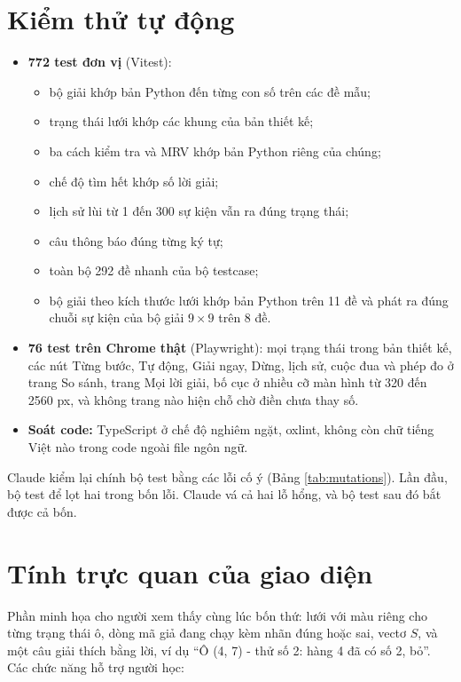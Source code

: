 \section{Kiểm thử tự động}

\begin{itemize}
  \item \textbf{772 test đơn vị} (Vitest):
  \begin{itemize}
    \item bộ giải khớp bản Python đến từng con số trên các đề mẫu;
    \item trạng thái lưới khớp các khung của bản thiết kế;
    \item ba cách kiểm tra và MRV khớp bản Python riêng của chúng;
    \item chế độ tìm hết khớp số lời giải;
    \item lịch sử lùi từ 1 đến 300 sự kiện vẫn ra đúng trạng thái;
    \item câu thông báo đúng từng ký tự;
    \item toàn bộ 292 đề nhanh của bộ testcase;
    \item bộ giải theo kích thước lưới khớp bản Python trên 11 đề và phát ra đúng chuỗi sự kiện của bộ giải \(9 \times 9\) trên 8 đề.
  \end{itemize}
  \item \textbf{76 test trên Chrome thật} (Playwright): mọi trạng thái trong bản thiết kế, các nút Từng bước, Tự động, Giải ngay, Dừng, lịch sử, cuộc đua và phép đo ở trang So sánh, trang Mọi lời giải, bố cục ở nhiều cỡ màn hình từ 320 đến 2560 px, và không trang nào hiện chỗ chờ điền chưa thay số.
  \item \textbf{Soát code:} TypeScript ở chế độ nghiêm ngặt, oxlint, không còn chữ tiếng Việt nào trong code ngoài file ngôn ngữ.
\end{itemize}

Claude kiểm lại chính bộ test bằng các lỗi cố ý (Bảng \ref{tab:mutations}). Lần đầu, bộ test để lọt hai trong bốn lỗi. Claude vá cả hai lỗ hổng, và bộ test sau đó bắt được cả bốn.

\section{Tính trực quan của giao diện}

Phần minh họa cho người xem thấy cùng lúc bốn thứ: lưới với màu riêng cho từng trạng thái ô, dòng mã giả đang chạy kèm nhãn đúng hoặc sai, vectơ \(S\), và một câu giải thích bằng lời, ví dụ ``Ô (4, 7) - thử số 2: hàng 4 đã có số 2, bỏ''. Các chức năng hỗ trợ người học:

